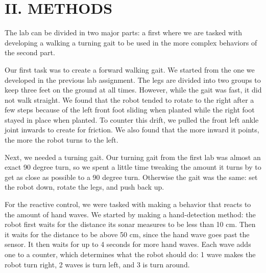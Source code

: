 \documentclass[11pt]{article}
\begin{document}

\section*{II. METHODS}

The lab can be divided in two major parts: a first where we are tasked with developing a walking a turning gait to be used in the more complex behaviors of the second part.

Our first task was to create a forward walking gait. We started from the one we developed in the previous lab assignment. The legs are divided into two groups to keep three feet on the ground at all times. However, while the gait was fast, it did not walk straight. We found that the robot tended to rotate to the right after a few steps because of the left front foot sliding when planted while the right foot stayed in place when planted. To counter this drift, we pulled the front left ankle joint inwards to create for friction. We also found that the more inward it points, the more the robot turns to the left.

Next, we needed a turning gait. Our turning gait from the first lab was almost an exact 90 degree turn, so we spent a little time tweaking the amount it turns by to get as close as possible to a 90 degree turn. Otherwise the gait was the same: set the robot down, rotate the legs, and push back up.

For the reactive control, we were tasked with making a behavior that reacts to the amount of hand waves. We started by making a hand-detection method: the robot first waits for the distance its sonar measures to be less than 10 cm. Then it waits for the distance to be above 50 cm, since the hand wave goes past the sensor. It then waits for up to 4 seconds for more hand waves. Each wave adds one to a counter, which determines what the robot should do: 1 wave makes the robot turn right, 2 waves is turn left, and 3 is turn around. 
\end{document}
